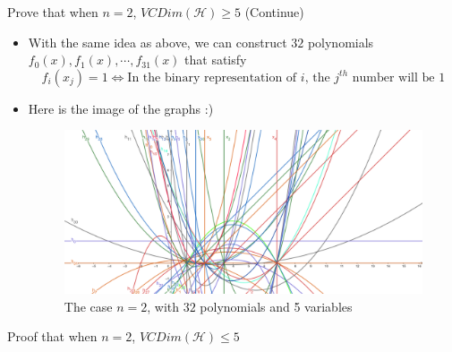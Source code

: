 \documentclass[9pt]{beamer}
\begin{document}
\begin{frame}{Prove that when $n=2$, $VCDim(\mathcal{H}) \geq 5$ (Continue)}
    \begin{itemize}
        \item With the same idea as above, we can construct $32$ polynomials $f_0(x),f_1(x),\cdots,f_{31}(x)$ that satisfy
        $$f_i(x_j) = 1 \iff \text{In the binary representation of $i$, the $j^{th}$ number will be $1$}$$
        \pause
        \item Here is the image of the graphs :)
        \begin{figure}
        \includegraphics[width = 1 \linewidth]{geogebra-export (4).png}
        \caption{The case $n=2$, with $32$ polynomials and 5 variables}
        \label{fig:my_label}
\end{figure}
    \end{itemize}
\end{frame}
\begin{frame}{Proof that when $n=2$, $VCDim(\mathcal{H}) \leq 5$}
\end{frame}
\end{document}
